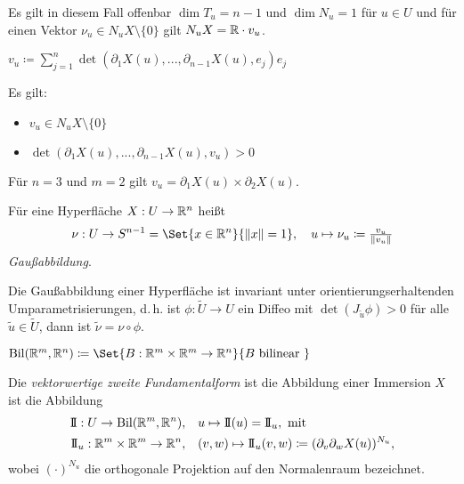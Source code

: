 \documentclass{cheat-sheet}
\newcommand{\Bil}{\mathrm{Bil}}
\newcommand{\II}{\mathrm{I\!I}}
\begin{document}
\begin{bem}
  Es gilt in diesem Fall offenbar $\dim T_u = n - 1$ und $\dim N_u = 1$ für $u \in U$ und für einen Vektor $\nu_u \in N_u X \setminus \{ 0 \}$ gilt $N_u X = \mathbb{R} \cdot v_u$.
\end{bem}

\begin{defn}
  $v_u \coloneqq \sum_{j=1}^{n} \det(\partial_1 X(u), ..., \partial_{n-1} X(u), e_j) e_j$
\end{defn}

\begin{bem}
  Es gilt:
  \begin{itemize}
    \item $v_u \in N_u X \setminus \{ 0 \}$
    \item $\det(\partial_1 X(u), ..., \partial_{n-1} X(u), v_u) > 0$
  \end{itemize}
\end{bem}

\begin{bem}
  Für $n = 3$ und $m = 2$ gilt $v_u = \partial_1 X(u) \times \partial_2 X(u)$.
\end{bem}

\begin{defn}
  Für eine Hyperfläche $X : U \to \mathbb{R}^n$ heißt
  \[ \nu : U \to S^{n-1} = \Set{ x \in \R^n }{ \| x \| = 1 }, \quad u \mapsto \nu_u \coloneqq \tfrac{v_u}{\| v_u \|} \]
  \emph{Gaußabbildung}.
\end{defn}

\begin{satz}
  Die Gaußabbildung einer Hyperfläche ist invariant unter orientierungserhaltenden Umparametrisierungen, d.\,h. ist $\phi : \tilde{U} \to U$ ein Diffeo mit $\det(J_{\tilde{u}} \phi) > 0$ für alle $\tilde{u} \in \tilde{U}$, dann ist $\tilde{\nu} = \nu \circ \phi$.
\end{satz}

\begin{nota}
  $\Bil(\R^m, \R^n) \coloneqq \Set{ B : \R^m \times \R^m \to \R^n }{ B \text{ bilinear } }$
\end{nota}

\begin{defn}
  Die \emph{vektorwertige zweite Fundamentalform} ist die Abbildung einer Immersion $X$ ist die Abbildung
  \begin{align*}
    \II : U \to \Bil(\R^m, \R^n), \quad & u \mapsto \II(u) = \II_u, \text { mit } \\
    \II_u : \R^m \times \R^m \to \R^n, \quad & (v, w) \mapsto \II_u(v, w) \coloneqq (\partial_v \partial_w X(u))^{N_u},
  \end{align*}
  wobei $(\cdot)^{N_u}$ die orthogonale Projektion auf den Normalenraum bezeichnet.
\end{defn}
\end{document}
